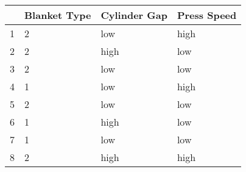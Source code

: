 \begin{table}[ht]
\centering
\begin{tabular}{rlll}
  \hline
 & Blanket Type & Cylinder Gap & Press Speed \\ 
  \hline
1 & 2 & low & high \\ 
  2 & 2 & high & low \\ 
  3 & 2 & low & low \\ 
  4 & 1 & low & high \\ 
  5 & 2 & low & low \\ 
  6 & 1 & high & low \\ 
  7 & 1 & low & low \\ 
  8 & 2 & high & high \\ 
   \hline
\end{tabular}
\end{table}
